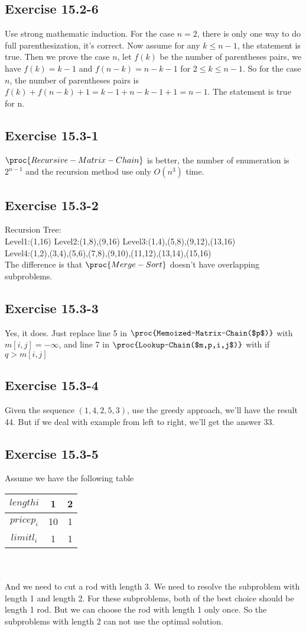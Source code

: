 \documentclass[12pt]{article}
\theoremstyle{definition}
\theoremstyle{remark}
\begin{document}
\subsection*{Exercise 15.2-6}
Use strong mathematic induction. For the case $n=2$, there is only one way to do full parenthesization, it's correct. Now assume for any $k\le n-1$, the statement is true. Then we prove the case $n$, let $f(k)$ be the number of parentheses pairs, we have $f(k)=k-1$ and $f(n-k)=n-k-1$ for $2\le k\le n-1$. So for the case $n$, the number of parentheses pairs is $f(k)+f(n-k)+1=k-1+n-k-1+1=n-1$. The statement is true for n.
\subsection*{Exercise 15.3-1}
$\proc{Recursive-Matrix-Chain}$ is better, the number of enumeration is $2^{n-1}$ and the recursion method use only $O(n^3)$ time.
\subsection*{Exercise 15.3-2}
Recursion Tree:\\
Level1:(1,16) Level2:(1,8),(9,16) Level3:(1,4),(5,8),(9,12),(13,16)\\
Level4:(1,2),(3,4),(5,6),(7,8),(9,10),(11,12),(13,14),(15,16)\\
The difference is that $\proc{Merge-Sort}$ doesn't have overlapping subproblems.
\subsection*{Exercise 15.3-3}
Yes, it does. Just replace line 5 in $\proc{Memoized-Matrix-Chain($p$)}$ with $m[i,j]=-\infty$, and line 7 in $\proc{Lookup-Chain($m,p,i,j$)}$ with if $q > m[i,j]$
\subsection*{Exercise 15.3-4}
Given the sequence $(1,4,2,5,3)$, use the greedy approach, we'll have the result 44. But if we deal with example from left to right, we'll get the answer 33.
\subsection*{Exercise 15.3-5}
Assume we have the following table\\
\begin{tabular}{c|c|c}\hline
$length i$ & 1 & 2\\ \hline
$price p_i$ & 10 & 1\\ \hline
$limit l_i$ & 1 & 1\\ \hline
\end{tabular}\\\\
And we need to cut a rod with length 3. We need to resolve the subproblem with length 1 and length 2. For these subproblems, both of the best choice should be length 1 rod. But we can choose the rod with length 1 only once. So the subproblems with length 2 can not use the optimal solution.
\end{document}
